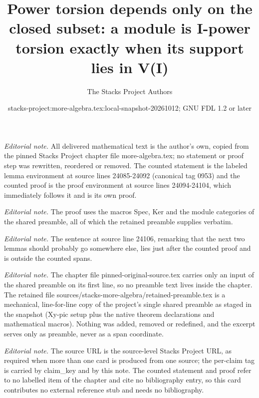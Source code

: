 \documentclass[10pt,a4paper]{amsart}
\title{Power torsion depends only on the closed subset: a module is I-power torsion exactly when its support lies in V(I)}
\author{The Stacks Project Authors}
\date{stacks-project:more-algebra.tex:local-snapshot-20261012; GNU FDL 1.2 or later}
\theoremstyle{plain}
\theoremstyle{definition}
\theoremstyle{remark}
\numberwithin{equation}{subsection}
\begin{document}
\maketitle
\setcounter{subsection}{1}
\noindent\textit{Editorial note.} All delivered mathematical text is the author's own, copied from the pinned Stacks Project chapter file more-algebra.tex; no statement or proof step was rewritten, reordered or removed. The counted statement is the labeled lemma environment at source lines 24085-24092 (canonical tag 0953) and the counted proof is the proof environment at source lines 24094-24104, which immediately follows it and is its own proof.\par\medskip
\noindent\textit{Editorial note.} The proof uses the macros Spec, Ker and the module categories of the shared preamble, all of which the retained preamble supplies verbatim.\par\medskip
\noindent\textit{Editorial note.} The sentence at source line 24106, remarking that the next two lemmas should probably go somewhere else, lies just after the counted proof and is outside the counted spans.\par\medskip
\noindent\textit{Editorial note.} The chapter file pinned-original-source.tex carries only an input of the shared preamble on its first line, so no preamble text lives inside the chapter. The retained file sources/stacks-more-algebra/retained-preamble.tex is a mechanical, line-for-line copy of the project's single shared preamble as staged in the snapshot (Xy-pic setup plus the native theorem declarations and mathematical macros). Nothing was added, removed or redefined, and the excerpt serves only as preamble, never as a span coordinate.\par\medskip
\noindent\textit{Editorial note.} The source URL is the source-level Stacks Project URL, as required when more than one card is produced from one source; the per-claim tag is carried by claim\_key and by this note. The counted statement and proof refer to no labelled item of the chapter and cite no bibliography entry, so this card contributes no external reference stub and needs no bibliography.\par\medskip
\end{document}
